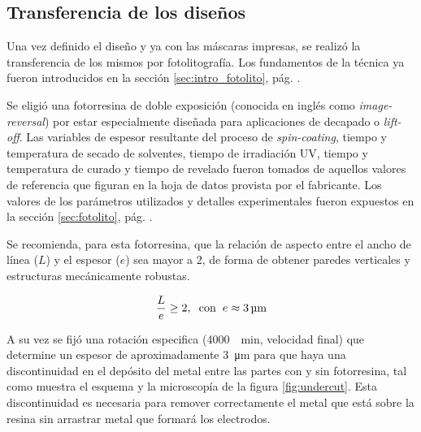 	\subsection{Transferencia de los diseños}

 			 Una vez definido el diseño y ya con las máscaras impresas, se realizó la transferencia de los mismos por fotolitografía. Los fundamentos de la técnica ya fueron introducidos en la sección \ref{sec:intro_fotolito}, pág. \pageref{sec:intro_fotolito}.

 			 Se eligió una fotorresina de doble exposición (conocida en inglés como \textit{image-reversal}) por estar especialmente diseñada para aplicaciones de decapado o \textit{lift-off}. Las variables de espesor resultante del proceso de \textit{spin-coating}, tiempo y temperatura de secado de solventes, tiempo de irradiación UV, tiempo y temperatura de curado y tiempo de revelado fueron tomados de aquellos valores de referencia que figuran en la hoja de datos provista por el fabricante. \cite{TI35E} Los valores de los parámetros utilizados y detalles experimentales fueron expuestos en la sección \ref{sec:fotolito}, pág. \pageref{sec:fotolito}.

 			 Se recomienda, para esta fotorresina, que la relación de aspecto entre el ancho de línea ($L$) y el espesor ($e$) sea mayor a 2, de forma de obtener paredes verticales y estructuras mecánicamente robustas. 

 				\begin{equation}
				\frac{L}{e} \geq 2, \hspace*{0.2cm}\text{con}\hspace{0.2cm}  e \approx \SI{3}{\um}		
 				\end{equation}

     		 A su vez se fijó una rotación especifica (\SI{4000}{\per\minute}, velocidad final) que determine un espesor de aproximadamente \SI{3}{\um} para que haya una discontinuidad en el depósito del metal entre las partes con y sin fotorresina, tal como muestra el esquema y la microscopía de la figura \ref{fig:undercut}. Esta discontinuidad es necesaria para remover correctamente el metal que está sobre la resina sin arrastrar metal que formará los electrodos. 

